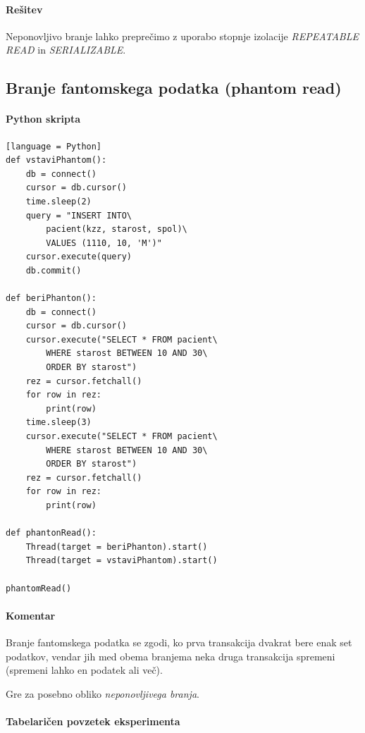 \documentclass[a4paper,11pt]{report}
\begin{document}
\paragraph{Rešitev}
Neponovljivo branje lahko preprečimo z uporabo stopnje izolacije \textit{REPEATABLE READ} in \textit{SERIALIZABLE}.


\pagebreak
\subsection*{Branje fantomskega podatka (phantom read)}

\paragraph{Python skripta}\mbox{}
\begin{lstlisting}[showstringspaces=false][language = Python]
def vstaviPhantom():
    db = connect()
    cursor = db.cursor()
    time.sleep(2)
    query = "INSERT INTO\ 
        pacient(kzz, starost, spol)\ 
        VALUES (1110, 10, 'M')"
    cursor.execute(query)
    db.commit()

def beriPhanton():
    db = connect()
    cursor = db.cursor()
    cursor.execute("SELECT * FROM pacient\ 
        WHERE starost BETWEEN 10 AND 30\ 
        ORDER BY starost")
    rez = cursor.fetchall()
    for row in rez:
        print(row)
    time.sleep(3)
    cursor.execute("SELECT * FROM pacient\ 
        WHERE starost BETWEEN 10 AND 30\ 
        ORDER BY starost")
    rez = cursor.fetchall()
    for row in rez:
        print(row)

def phantonRead():
    Thread(target = beriPhanton).start()
    Thread(target = vstaviPhantom).start()

phantomRead()
\end{lstlisting}

\paragraph{Komentar}
Branje fantomskega podatka se zgodi, ko prva transakcija dvakrat bere enak set podatkov, vendar jih med obema branjema
neka druga transakcija spremeni (spremeni lahko en podatek ali več).

Gre za posebno obliko \textit{neponovljivega branja}.
\pagebreak
\paragraph{Tabelaričen povzetek eksperimenta}\mbox{}
\end{document}
